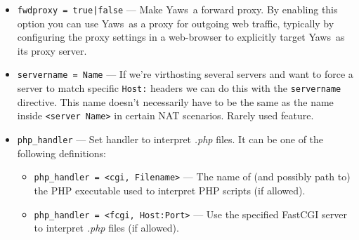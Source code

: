 \documentclass[11pt,oneside,english]{book}
\newcommand{\Yaws}            %
        {{\sc Yaws}}
\begin{document}
\begin{itemize}
              Any failure within an intercept module function results in
              HTTP status code 500 (Internal Server Error) being returned
              to the client.

              Intercept modules can use the following functions from the
              \verb+yaws_api+ module to retrieve, set, or delete HTTP
              headers from \verb+#headers{}+ records:

\begin{itemize}
\item \verb+set_header/2+, \verb+set_header/3+
\item \verb+get_header/2+, \verb+get_header/3+
\item \verb+delete_header/2+
\end{itemize}

\item       \verb+fwdproxy = true|false+ ---
              Make \Yaws\ a forward proxy. By enabling this option you can use
              \Yaws\ as a proxy for outgoing web traffic, typically by
              configuring the proxy settings in a web-browser to explicitly
              target \Yaws\ as its proxy server.

\item       \verb+servername = Name+ ---
              If we're virthosting several servers and want to force a server to
              match specific \verb+Host:+ headers we can do this with the \verb+servername+
              directive. This name doesn't necessarily have to be the same as
              the name inside \verb+<server Name>+ in certain NAT scenarios. Rarely
              used feature.

\item       \verb+php_handler+ ---
              Set handler to interpret \textit{.php} files. It can be
              one of the following definitions:

              \begin{itemize}
              \item \verb+php_handler = <cgi, Filename>+ --- The name
                of (and possibly path to) the PHP executable used to
                interpret PHP scripts (if allowed).
              \item \verb+php_handler = <fcgi, Host:Port>+ --- Use the
                specified FastCGI server to interpret \textit{.php}
                files (if allowed).


\end{itemize}
\end{itemize}
\end{document}
